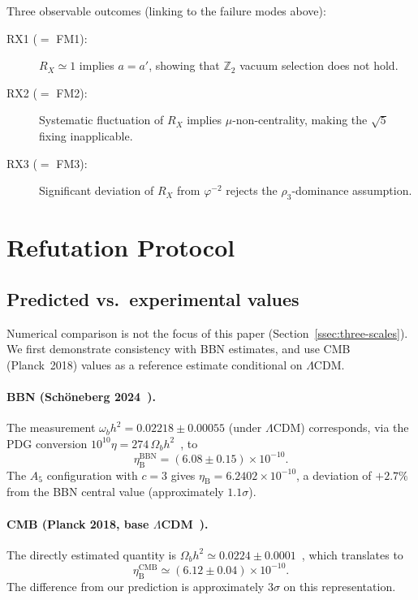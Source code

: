 \documentclass[sn-mathphys-num,Numbered]{sn-jnl}
\theoremstyle{thmstyleone}
\theoremstyle{thmstylethree}
\theoremstyle{thmstyletwo}
\newcommand{\etaB}{\eta_{\mathrm{B}}}
\begin{document}
Three observable outcomes (linking to the failure modes above):
\begin{description}
  \item[RX1 ($= $ FM1):] $R_X \simeq 1$ implies $a = a'$, showing that
    $\mathbb{Z}_2$ vacuum selection does not hold.
  \item[RX2 ($= $ FM2):] Systematic fluctuation of $R_X$ implies
    $\mu$-non-centrality, making the $\sqrt{5}$ fixing inapplicable.
  \item[RX3 ($= $ FM3):] Significant deviation of $R_X$ from
    $\varphi^{-2}$ rejects the $\rho_3$-dominance assumption.
\end{description}
\section{Refutation Protocol}
\label{sec:refutation}

\subsection{Predicted vs.\ experimental values}
\label{ssec:comparison}

Numerical comparison is not the focus of this paper (Section~\ref{ssec:three-scales}).
We first demonstrate consistency with BBN estimates, and use
CMB (Planck~2018) values as a reference estimate conditional on
$\Lambda$CDM.

\paragraph{BBN (Sch\"{o}neberg 2024~\cite{Schoneberg2024}).}
The measurement $\omega_b h^2 = 0.02218 \pm 0.00055$ (under
$\Lambda$CDM) corresponds, via the PDG conversion
$10^{10}\eta = 274\,\Omega_b h^2$~\cite{PDG2022}, to
\[
  \etaB^{\mathrm{BBN}} = (6.08 \pm 0.15)\times 10^{-10}.
\]
The $A_5$ configuration with $c=3$ gives
$\etaB = 6.2402\times10^{-10}$, a deviation of $+2.7\%$ from the BBN
central value (approximately $1.1\sigma$).

\paragraph{CMB (Planck 2018, base $\Lambda$CDM~\cite{Planck2018}).}
The directly estimated quantity is $\Omega_b h^2 \simeq
0.0224 \pm 0.0001$~\cite{Planck2018}, which translates to
\[
  \etaB^{\mathrm{CMB}} \simeq (6.12 \pm 0.04)\times 10^{-10}.
\]
The difference from our prediction is approximately $3\sigma$ on this
representation.
\end{document}
